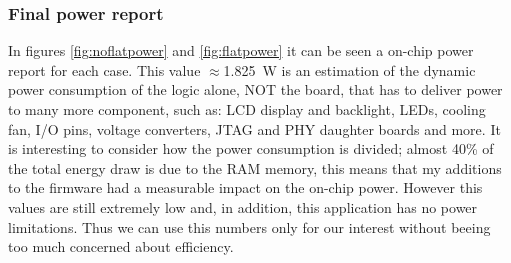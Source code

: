 \subsubsection{Final power report}
\noindent In figures \ref{fig:noflatpower} and \ref{fig:flatpower} it can be seen a on-chip power report for each case.
This value $\approx$1.825~W is an estimation of the dynamic power consumption of the logic alone, NOT the board, that has to deliver power to many more component, such as: LCD display and backlight, LEDs, cooling fan, I/O pins, voltage converters, JTAG and PHY daughter boards and more.
It is interesting to consider how the power consumption is divided; almost 40\% of the total energy draw is due to the RAM memory, this means that my additions to the firmware had a measurable impact on the on-chip power. However this values are still extremely low and, in addition, this application has no power limitations. Thus we can use this numbers only for our interest without beeing too much concerned about efficiency. 
